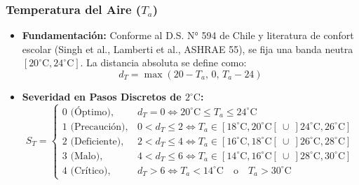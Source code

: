 \documentclass[11pt,a4paper]{article}
\begin{document}
\subsubsection{Temperatura del Aire (\texorpdfstring{$T_a$}{Ta})}
\begin{itemize}
    \item \textbf{Fundamentación:} Conforme al D.S. N° 594 de Chile y literatura de confort escolar (Singh et al., Lamberti et al., ASHRAE 55), se fija una banda neutra $[20^\circ\text{C}, 24^\circ\text{C}]$. La distancia absoluta se define como:
    \begin{equation}
    d_T = \max(20 - T_a, \, 0, \, T_a - 24)
    \end{equation}
    \item \textbf{Severidad en Pasos Discretos de $2^\circ\text{C}$:}
    \begin{equation}
    S_T = \begin{cases}
    0\text{ (Óptimo)}, & d_T = 0 \iff 20^\circ\text{C} \le T_a \le 24^\circ\text{C} \\
    1\text{ (Precaución)}, & 0 < d_T \le 2 \iff T_a \in [18^\circ\text{C}, 20^\circ\text{C}[\ \cup\ ]24^\circ\text{C}, 26^\circ\text{C}] \\
    2\text{ (Deficiente)}, & 2 < d_T \le 4 \iff T_a \in [16^\circ\text{C}, 18^\circ\text{C}[\ \cup\ ]26^\circ\text{C}, 28^\circ\text{C}] \\
    3\text{ (Malo)}, & 4 < d_T \le 6 \iff T_a \in [14^\circ\text{C}, 16^\circ\text{C}[\ \cup\ ]28^\circ\text{C}, 30^\circ\text{C}] \\
    4\text{ (Crítico)}, & d_T > 6 \iff T_a < 14^\circ\text{C} \quad\text{o}\quad T_a > 30^\circ\text{C}
    \end{cases}
    \end{equation}
\end{itemize}
\end{document}
